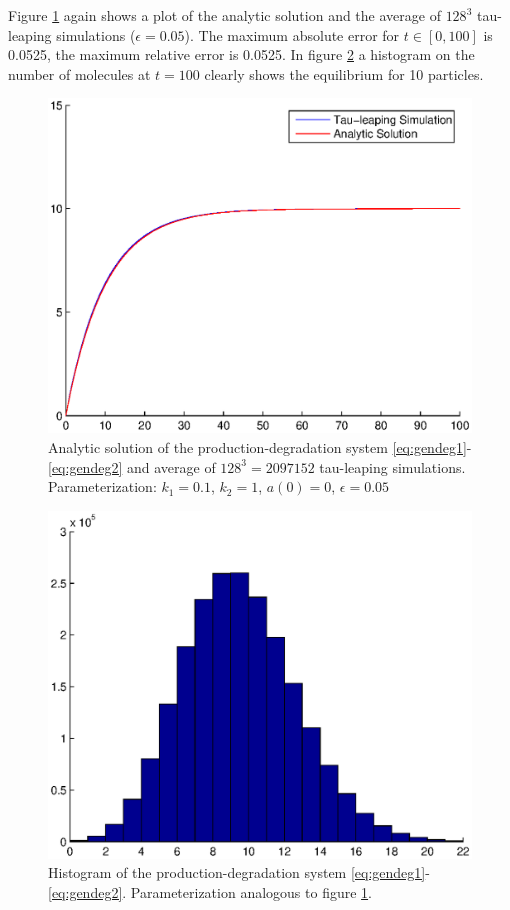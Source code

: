 Figure \ref{fig:prod_deg_time} again shows a plot of the analytic solution and the average of ${128}^3$ tau-leaping simulations ($\epsilon = 0.05$). The maximum absolute error for $t \in [0,100]$ is 0.0525, the maximum relative error is 0.0525. In figure \ref{fig:prod_deg_hist} a histogram on the number of molecules at $t=100$ clearly shows the equilibrium for 10 particles. 

\begin{figure}
\centering
\includegraphics[width=\textwidth]{images/prod_deg_time.eps}
\caption{Analytic solution of the production-degradation system \eqref{eq:gendeg1}-\eqref{eq:gendeg2} and average of $128^3=2097152$ tau-leaping simulations. Parameterization: $k_1 = 0.1$, $k_2 = 1$, $a(0) = 0$, $\epsilon = 0.05$}
\label{fig:prod_deg_time}
\end{figure}

\begin{figure}
\centering
\includegraphics[width=\textwidth]{images/prod_deg_hist.eps}
\caption{Histogram of the production-degradation system \eqref{eq:gendeg1}-\eqref{eq:gendeg2}. Parameterization analogous to figure \ref{fig:prod_deg_time}. }
\label{fig:prod_deg_hist}
\end{figure}

